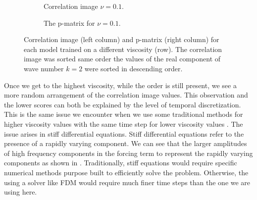 \begin{figure}[H]
\begin{subfigure}{0.49\linewidth}
\begin{adjustbox}{width=\linewidth}
      
    \end{adjustbox}
    \caption{Correlation image \(\nu=0.1\).}\label{fig:sc2_ci_0.1}
  \end{subfigure}
  \begin{subfigure}{0.49\linewidth}
    \begin{adjustbox}{width=\linewidth}
      
    \end{adjustbox}
    \caption{The p-matrix for \(\nu=0.1\).}\label{fig:sc2_pm_0.1}
  \end{subfigure}
  \caption{Correlation image (left column) and p-matrix (right column) for each model trained on a different viscosity (row). The correlation image was sorted same order the values of the real component of wave number \(k=2\) were sorted in descending order.}\label{fig:scenario_2_interpretation}
\end{figure}

Once we get to the highest viscosity, while the order is still present, we see a more random arrangement of the correlation image values. This observation and the lower scores can both be explained by the level of temporal discretization. This is the same issue we encounter when we use some traditional methods for higher viscosity values with the same time step for lower viscosity values \autocite{kassamFourthOrderTimeSteppingStiff2005,seydaogluNumericalSolutionBurgers2016}. The issue arises in stiff differential equations. Stiff differential equations refer to the presence of a rapidly varying component. We can see that the larger amplitudes of high frequency components in the forcing term to represent the rapidly varying components as shown in . Traditionally, stiff equations would require specific numerical methods purpose built to efficiently solve the problem. Otherwise, the using a solver like FDM would require much finer time steps than the one we are using here.

